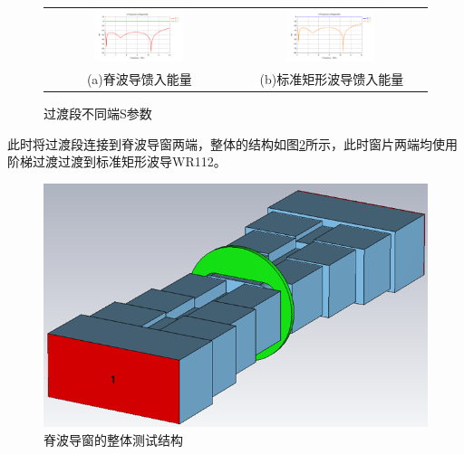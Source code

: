 \documentclass[master]{thesis-uestc}
\begin{document}
\begin{figure}[!htb]
    \small
    \centering
    \begin{tabular}{@{\ }c@{\ }c}
        \includegraphics[width=0.49\textwidth]{pic/chapter3/一端口馈入.png} & 
        \hspace{5pt}
        \includegraphics[width=0.49\textwidth]{pic/chapter3/二端口馈入.png}     \\
        \mbox{\small (a)脊波导馈入能量}                                                                               & 
        \mbox{\small (b)标准矩形波导馈入能量}                                                                                  \\
    \end{tabular}
    \caption{过渡段不同端S参数}
    \label{fig:过渡段不同端馈入的S参数}
\end{figure}

此时将过渡段连接到脊波导窗两端，整体的结构如图\ref{fig:脊波导窗的整体测试结构}所示，此时窗片两端均使用阶梯过渡过渡到标准矩形波导WR112。
\begin{figure}[!htb]
    \centering
    \includegraphics[width=0.5\linewidth]{pic/chapter3/脊波导窗整体测试结构.png}
    \caption{脊波导窗的整体测试结构}
    \label{fig:脊波导窗的整体测试结构}
\end{figure}
\end{document}
